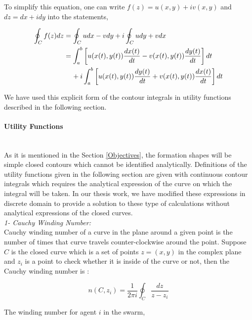 To simplify this equation, one can write $f(z) = u(x,y) + iv(x,y)$ and $dz = dx + idy$ into the statements,
		
\begin{align} \label{contour_integral}
\begin{split}
\oint_C f(z)dz & = \oint_C u dx - v dy + i \oint_C u dy + v dx \\
&= \int_{a}^{b}\left[u(x(t),y(t) )\frac{dx(t)}{dt} - v(x(t),y(t) )\frac{dy(t)}{dt}\right]dt\\
& \hspace{0.4cm} + i\int_{a}^{b} \left[u(x(t),y(t) )\frac{dy(t)}{dt} + v(x(t),y(t) )\frac{dx(t)}{dt}\right]dt
\end{split}
\end{align}

We have used this explicit form of the contour integrals in utility functions described in the following section. 		
		
\paragraph{Utility Functions}\hspace{0pt} \\
As it is mentioned in the Section \ref{Objectives}, the formation shapes will be simple closed contours which cannot be identified analytically. Definitions of the utility functions given in the following section are given with continuous contour integrals which requires the analytical expression of the curve on which the integral will be taken. In our thesis work, we have modified these expressions in discrete domain to provide a solution to  these type of calculations without analytical expressions of the closed curves.\\

\textit{ 		1- Cauchy Winding Number:} \\ 
Cauchy winding number of a curve in the plane around a given point is the number of times that curve travels counter-clockwise around the point. Suppose $C$ is the closed curve which is a set of points $z=(x,y)$ in the complex plane  and $z_i$ is a point to check whether it is inside of the curve or not, then the Cauchy winding number is \cite{17} :
					
\begin{equation}
 n(C,z_i) = \frac{1}{2\pi i}\oint_C \frac{dz}{z-z_i}
\end{equation}
		
The winding number for agent $i$ in the swarm,

